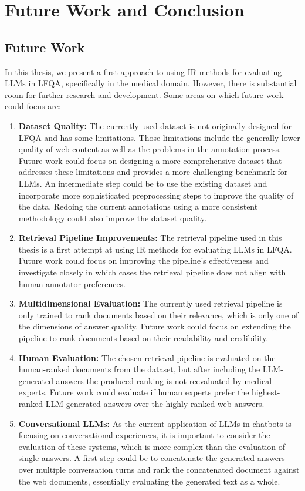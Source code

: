 \chapter{Future Work and Conclusion}\label{conclusion}

\section{Future Work}
In this thesis, we present a first approach to using IR methods for evaluating LLMs in LFQA, specifically in the medical domain.
However, there is substantial room for further research and development.
Some areas on which future work could focus are:

\begin{enumerate}
    \item \textbf{Dataset Quality:} The currently used dataset is not originally designed for LFQA and has some limitations. Those limitations include the generally lower quality of web content as well as the problems in the annotation process. Future work could focus on designing a more comprehensive dataset that addresses these limitations and provides a more challenging benchmark for LLMs. An intermediate step could be to use the existing dataset and incorporate more sophisticated preprocessing steps to improve the quality of the data. Redoing the current annotations using a more consistent methodology could also improve the dataset quality.
    \item \textbf{Retrieval Pipeline Improvements:} The retrieval pipeline used in this thesis is a first attempt at using IR methods for evaluating LLMs in LFQA. Future work could focus on improving the pipeline's effectiveness and investigate closely in which cases the retrieval pipeline does not align with human annotator preferences. 
    \item \textbf{Multidimensional Evaluation:} The currently used retrieval pipeline is only trained to rank documents based on their relevance, which is only one of the dimensions of answer quality. Future work could focus on extending the pipeline to rank documents based on their readability and credibility.
    \item \textbf{Human Evaluation:} The chosen retrieval pipeline is evaluated on the human-ranked documents from the dataset, but after including the LLM-generated answers the produced ranking is not reevaluated by medical experts. Future work could evaluate if human experts prefer the highest-ranked LLM-generated answers over the highly ranked web answers.
    \item \textbf{Conversational LLMs:} As the current application of LLMs in chatbots is focusing on conversational experiences, it is important to consider the evaluation of these systems, which is more complex than the evaluation of single answers. A first step could be to concatenate the generated answers over multiple conversation turns and rank the concatenated document against the web documents, essentially evaluating the generated text as a whole.
\end{enumerate}

